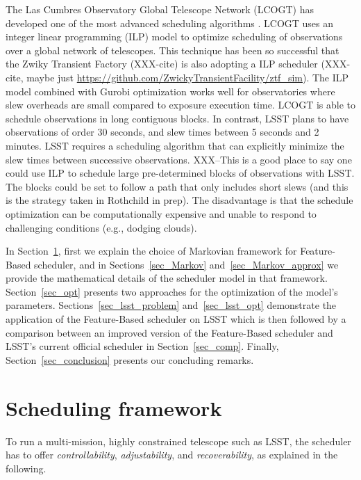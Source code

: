 \documentclass[12pt]{aastex62}
\theoremstyle{definition}
\begin{document}
The Las Cumbres Observatory Global Telescope Network (LCOGT) has developed one of the most advanced scheduling algorithms \citep{Boroson14, Saunders14}. LCOGT uses an integer linear programming (ILP) model to optimize scheduling of observations over a global network of telescopes\citep{Lampoudi15}. This technique has been so successful that the Zwiky Transient Factory (XXX-cite) is also adopting a ILP scheduler (XXX-cite, maybe just \url{https://github.com/ZwickyTransientFacility/ztf_sim}). The ILP model combined with Gurobi optimization works well for observatories where slew overheads are small compared to exposure execution time. LCOGT is able to schedule observations in long contiguous blocks. In contrast, LSST plans to have observations of order 30 seconds, and slew times between 5 seconds and 2 minutes. LSST requires a scheduling algorithm that can explicitly minimize the slew times between successive observations. XXX--This is a good place to say one could use ILP to schedule large pre-determined blocks of observations with LSST. The blocks could be set to follow a path that only includes short slews (and this is the strategy taken in Rothchild in prep). The disadvantage is that the schedule optimization can be computationally expensive and unable to respond to challenging conditions (e.g., dodging clouds). 

In Section~\ref{sec_SM}, first we explain the choice of Markovian framework for Feature-Based scheduler, and in Sections~\ref{sec_Markov} and~\ref{sec_Markov_approx} we provide the mathematical details of the scheduler model in that framework. Section~\ref{sec_opt} presents two approaches for the optimization of the model's parameters. Sections~\ref{sec_lsst_problem} and~\ref{sec_lsst_opt} demonstrate the application of the Feature-Based scheduler on LSST which is then followed by a comparison between an improved version of the Feature-Based scheduler and LSST's current official scheduler in Section~\ref{sec_comp}. Finally, Section~\ref{sec_conclusion} presents our concluding remarks.



\section{Scheduling framework}\label{sec_SM}

To run a multi-mission, highly constrained telescope such as LSST, the scheduler has to offer \textit{controllability}, \textit{adjustability}, and \textit{recoverability}, as explained in the following.
\end{document}
